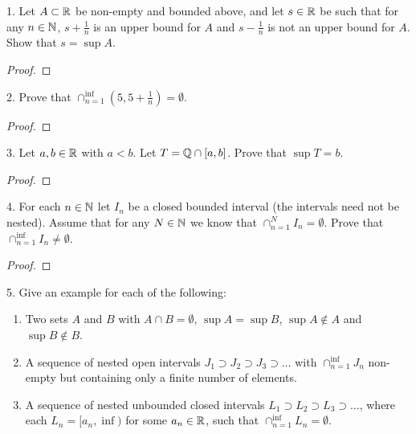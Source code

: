 
1. Let $A \subset \mathbb{R}$ be non-empty and bounded above, and let $s \in \mathbb{R}$ be such that for any $n \in \mathbb{N}$, $s + \frac{1}{n}$ is an upper bound for $A$ and $s-\frac{1}{n}$ is not an upper bound for $A$. Show that $s = \sup A$.

\begin{proof}
	
\end{proof}



2. Prove that $\cap_{n=1}^{\inf}\left( 5, 5+\frac{1}{n} \right) = \emptyset$.

\begin{proof}
	
\end{proof}




3. Let $a, b \in \mathbb{R}$ with $a < b$. Let $T = \mathbb{Q} \cap [a, b]$. Prove that $\sup T = b$.

\begin{proof}
	
\end{proof}





4. For each $n \in \mathbb{N}$ let $I_n$ be a closed bounded interval (the intervals need not be nested). Assume that for any $N \in \mathbb{N}$ we know that $\cap_{n=1}^{N}I_n = \emptyset$. Prove that $\cap_{n=1}^{\inf}I_n \neq \emptyset$.

\begin{proof}
	
\end{proof}





5. Give an example for each of the following: 
\begin{enumerate}
	\item Two sets $A$ and $B$ with $A \cap B = \emptyset$, $\sup A = \sup B$, $\sup A \not\in A$ and $\sup B \not\in B$.
	\item A sequence of nested open intervals $J_1 \supset J_2 \supset J_3 \supset \ldots$ with $\cap_{n=1}^{\inf}J_n$ non-empty but containing only a finite number of elements.
	\item A sequence of nested unbounded closed intervals $L_1 \supset L_2 \supset L_3 \supset \ldots$, where each $L_n = [a_n, \inf)$ for some $a_n \in \mathbb{R}$, such that $\cap_{n=1}^{\inf}L_n = \emptyset$.
\end{enumerate}




